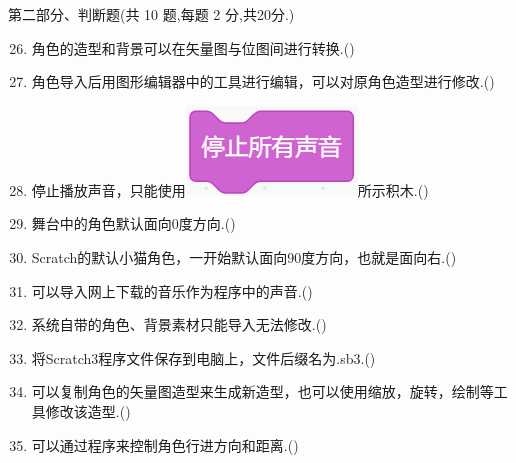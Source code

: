 \documentclass[10pt, a4paper]{article}
\begin{document}
    \newpage
    {\noindent\heiti 第二部分、判断题(共 10 题,每题 2 分,共20分.)}
    \begin{enumerate}
        \setcounter{enumi}{25}
        \item 角色的造型和背景可以在矢量图与位图间进行转换.(\qquad)

        \item 角色导入后用图形编辑器中的工具进行编辑，可以对原角色造型进行修改.(\qquad)
        
        \item 停止播放声音，只能使用\includegraphics[width=.1\textwidth]{28.png}所示积木.(\qquad)
  
        \item 舞台中的角色默认面向0度方向.(\qquad)
        
        \item Scratch的默认小猫角色，一开始默认面向90度方向，也就是面向右.(\qquad)

        \item 可以导入网上下载的音乐作为程序中的声音.(\qquad)
        
        \item 系统自带的角色、背景素材只能导入无法修改.(\qquad)
        
        \item 将Scratch3程序文件保存到电脑上，文件后缀名为.sb3.(\qquad)
        
        \item 可以复制角色的矢量图造型来生成新造型，也可以使用缩放，旋转，绘制等工具修改该造型.(\qquad)
        
        \item 可以通过程序来控制角色行进方向和距离.(\qquad)
    \end{enumerate}
\end{document}
